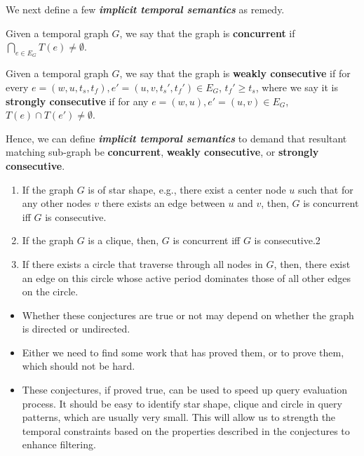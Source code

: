 We next define a few {\bf {\em implicit temporal semantics}} as remedy. 

\begin{defn}
  \label{def:concur}
  Given a temporal graph $G$, we say that the graph is {\bf concurrent} if
  $\displaystyle\bigcap_{e \in E_G}T(e) \neq \emptyset$.
\end{defn}

\begin{defn}
  \label{def:consec}  
  Given a temporal graph $G$, we say that the graph is \textbf{weakly
    consecutive} if for every $e = (w,u,t_s, t_f), e' = (u,v,t_s', t_f') \in
  E_G$, $t_f' \geq t_s$, where we say it is {\bf strongly consecutive} if for
  any $e = (w,u), e'=(u,v) \in E_G$, $T(e) \cap T(e') \neq \emptyset$.
\end{defn}

Hence, we can define {\bf {\em implicit temporal semantics}} to demand that
resultant matching sub-graph be \textbf{concurrent}, \textbf{weakly
  consecutive}, or \textbf{strongly consecutive}.

\SmallSpace
{}
 \begin{enumerate}
	\item If the graph $G$ is of star shape, e.g., there exist a center node
          $u$ such that for any other nodes $v$ there exists an edge between $u$
          and $v$, then, $G$ is concurrent iff $G$ is consecutive.
	\item If the graph $G$ is a clique, then, $G$ is concurrent iff $G$ is
          consecutive.2
	\item If there exists a circle that traverse through all nodes in $G$,
          then, there exist an edge on this circle whose active period dominates
          those of all other edges on the circle.
	
\end{enumerate}

\begin{itemize}
	\item Whether these conjectures are true or not may depend on whether
          the graph is directed or undirected.
	\item Either we need to find some work that has proved them, or to prove
          them, which should not be hard.
	\item These conjectures, if proved true, can be used to speed up query
          evaluation process. It should be easy to identify star shape, clique
          and circle in query patterns, which are usually very small. This will
          allow us to strength the temporal constraints based on the properties
          described in the conjectures to enhance filtering.

\end{itemize}

